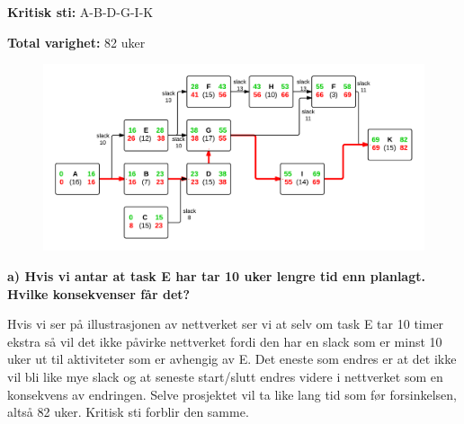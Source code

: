 		{\bf Kritisk sti:} A-B-D-G-I-K

		{\bf Total varighet:} 82 uker

		\begin{figure}[H]
			\includegraphics[width=\textwidth]{task4.png}
		\end{figure}

		{\bf a) Hvis vi antar at task E har tar 10 uker lengre tid enn planlagt. Hvilke konsekvenser får det?}

		Hvis vi ser på illustrasjonen av nettverket ser vi at selv om task E tar 10 timer ekstra
		så vil det ikke påvirke nettverket fordi den har en slack som er minst 10 uker ut til 
		aktiviteter som er avhengig av E. Det eneste som endres er at det ikke vil bli like mye slack og at 
		seneste start/slutt endres videre i nettverket som en konsekvens av endringen. Selve prosjektet
		vil ta like lang tid som før forsinkelsen, altså 82 uker. Kritisk sti forblir den samme. 
